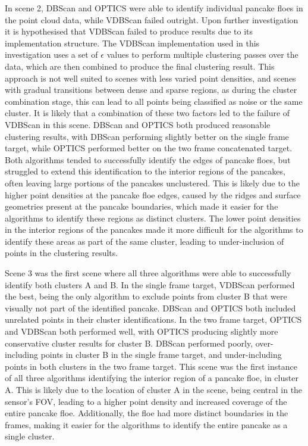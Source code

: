 In scene 2, \ac{DBScan} and \ac{OPTICS} were able to identify individual pancake floes in the point cloud data, while \ac{VDBScan} failed outright. Upon further investigation it is hypothesised that \ac{VDBScan} failed to produce results due to its implementation structure. The \ac{VDBScan} implementation used in this investigation uses a set of \textbf{$\epsilon$} values to perform multiple clustering passes over the data, which are then combined to produce the final clustering result. This approach is not well suited to scenes with less varied point densities, and scenes with gradual transitions between dense and sparse regions, as during the cluster combination stage, this can lead to all points being classified as noise or the same cluster. It is likely that a combination of these two factors led to the failure of \ac{VDBScan} in this scene.
\ac{DBScan} and \ac{OPTICS} both produced reasonable clustering results, with \ac{DBScan} performing slightly better on the single frame target, while \ac{OPTICS} performed better on the two frame concatenated target. Both algorithms tended to successfully identify the edges of pancake floes, but struggled to extend this identification to the interior regions of the pancakes, often leaving large portions of the pancakes unclustered. This is likely due to the higher point densities at the pancake floe edges, caused by the ridges and surface geometries present at the pancake boundaries, which made it easier for the algorithms to identify these regions as distinct clusters. The lower point densities in the interior regions of the pancakes made it more difficult for the algorithms to identify these areas as part of the same cluster, leading to under-inclusion of points in the clustering results.

Scene 3 was the first scene where all three algorithms were able to successfully identify both clusters A and B. In the single frame target, \ac{VDBScan} performed the best, being the only algorithm to exclude points from cluster B that were visually not part of the identified pancake. \ac{DBScan} and \ac{OPTICS} both included unrelated points in their cluster identifications. In the two frame target, \ac{OPTICS} and \ac{VDBScan} both performed well, with \ac{OPTICS} producing slightly more conservative cluster results for cluster B. \ac{DBScan} performed poorly, over-including points in cluster B in the single frame target, and under-including points in both clusters in the two frame target. This scene was the first instance of all three algorithms identifying the interior region of a pancake floe, in cluster A. This is likely due to the location of cluster A in the scene, being central in the sensor's \ac{FOV}, leading to a higher point density and increased coverage of the entire pancake floe. Additionally, the floe had more distinct boundaries in the frames, making it easier for the algorithms to identify the entire pancake as a single cluster.

